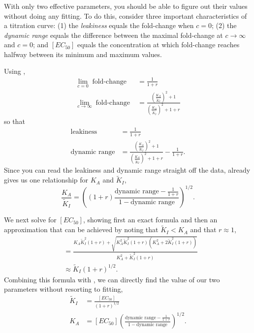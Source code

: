 \documentclass[10pt,letterpaper]{article}
\newcommand \foldchange{\operatorname{fold-change}}
\begin{document}
With only two effective parameters, you should be able to figure out their
values without doing any fitting. To do this, consider three important
characteristics of a titration curve: (1) the \textit{leakiness} equals the fold-change
when $c=0$; (2) the \textit{dynamic range} equals the difference between the maximal
fold-change at $c\to\infty$ and $c=0$; and $[EC_{50}]$ equals the concentration at
which fold-change reaches halfway between its minimum and maximum values.

Using \eref[AppendixSloppinessEq1], 
\begin{align}
\lim_{c = 0}\foldchange &= \frac{1}{1+r}\\
\lim_{c \to \infty}\foldchange &= \frac{\left(\frac{K_A}{\widetilde{K}_I}\right)^2 + 1}{\left(\frac{K_A}{\widetilde{K}_I}\right)^2 + 1+r}
\end{align}
so that
\begin{align}
\text{leakiness} &= \frac{1}{1+r} \label{AppendixSloppinessEq3} \\
\text{dynamic range} &= \frac{\left(\frac{K_A}{\widetilde{K}_I}\right)^2 + 1}{\left(\frac{K_A}{\widetilde{K}_I}\right)^2 + 1+r} - \frac{1}{1+r}. \label{AppendixSloppinessEq4}
\end{align}
Since you can read the leakiness and dynamic range straight off the data, \eref[AppendixSloppinessEq4] already gives us one relationship for $K_A$ and $\widetilde{K}_I$,
\begin{equation} \label{AppendixSloppinessEq5}
\frac{K_A}{\widetilde{K}_I} = \left( \left(1+r\right) \frac{\text{dynamic range} - \frac{1}{1+r}}{1-\text{dynamic range}} \right)^{1/2}.
\end{equation}

We next solve for $[EC_{50}]$, showing first an exact formula and then an approximation that can be achieved by noting that $\widetilde{K}_I < K_A$ and that $r \approx 1$,
\begin{align}
[EC_{50}] &= \frac{K_A \widetilde{K}_I^2 \left(1+r\right) + \sqrt{K_A^2 \widetilde{K}_I^2 \left(1+r\right) \left(K_A^2 + 2 \widetilde{K}_I^2 \left(1+r\right) \right)}}{K_A^2 + \widetilde{K}_I^2 \left(1+r\right)}\nonumber\\
&\approx \widetilde{K}_I \left(1+r\right)^{1/2}.
\end{align}
Combining this formula with \eref[AppendixSloppinessEq5], we can directly find the value of our two parameters without resorting to fitting,
\begin{align}
\widetilde{K}_I &= \frac{[EC_{50}]}{\left(1+r\right)^{1/2}}\\
K_A &= [EC_{50}] \left(\frac{\text{dynamic range} - \frac{1}{1+r}}{1-\text{dynamic range}} \right)^{1/2}.
\end{align}
\end{document}
